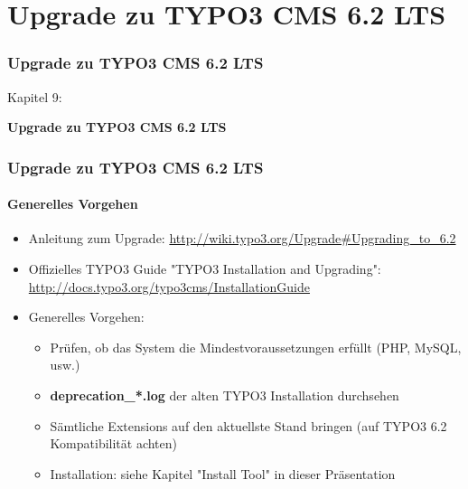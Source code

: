 %

\section{Upgrade zu TYPO3 CMS 6.2 LTS}
\begin{frame}[fragile]
	\frametitle{Upgrade zu TYPO3 CMS 6.2 LTS}

	\begin{center}\huge{Kapitel 9:}\end{center}
	\begin{center}\huge{\color{typo3darkgrey}\textbf{Upgrade zu TYPO3 CMS 6.2 LTS}}\end{center}

\end{frame}


\begin{frame}[fragile]
	\frametitle{Upgrade zu TYPO3 CMS 6.2 LTS}
	\framesubtitle{Generelles Vorgehen}

	\begin{itemize}
		\item Anleitung zum Upgrade:\newline
			\smaller\url{http://wiki.typo3.org/Upgrade#Upgrading_to_6.2}\normalsize
		\item Offizielles TYPO3 Guide "TYPO3 Installation and Upgrading":
			\smaller\url{http://docs.typo3.org/typo3cms/InstallationGuide}\normalsize
		\item Generelles Vorgehen:
			\begin{itemize}
				\item Prüfen, ob das System die Mindestvoraussetzungen erfüllt\newline
					\small(PHP, MySQL, usw.)\normalsize
				\item \textbf{deprecation\_*.log} der alten TYPO3 Installation durchsehen
				\item Sämtliche Extensions auf den aktuellste Stand bringen\newline
					\small(auf TYPO3 6.2 Kompatibilität achten)\normalsize
				\item Installation: siehe Kapitel "Install Tool" in dieser Präsentation
			\end{itemize}
	\end{itemize}

\end{frame}

